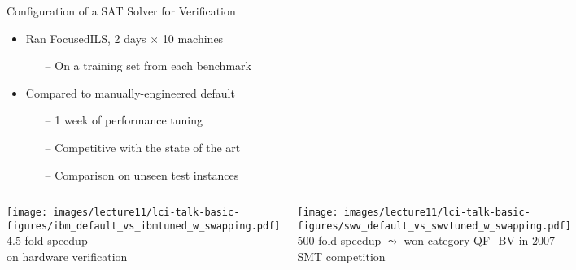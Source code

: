 \begin{frame}[c,fragile]{Configuration of a SAT Solver for Verification}
\begin{itemize}
        \item Ran FocusedILS, 2 days $\times$ 10 machines
        \begin{itemize}
                \item[--] On a training set from each benchmark
        \end{itemize}
        
\vspace*{0.0cm}
        \item Compared to manually-engineered default
        \begin{itemize}
                \item[--] 1 week of performance tuning
                \item[--] Competitive with the state of the art
                \item[--] Comparison on unseen test instances
         \end{itemize}

\vspace*{-10mm}
\end{itemize}


\begin{columns}
        \begin{center}  
                \texttt{[image: images/lecture11/lci-talk-basic-figures/ibm\_default\_vs\_ibmtuned\_w\_swapping.pdf]}\\
                \alert{$4.5$-fold speedup}\\ on hardware verification
        \end{center}
        \begin{center}
                \texttt{[image: images/lecture11/lci-talk-basic-figures/swv\_default\_vs\_swvtuned\_w\_swapping.pdf]}\\        
                \alert{500-fold speedup $\leadsto$ won category QF\_BV in 2007 SMT competition}
        \end{center}
\end{columns}                                


\end{frame}



